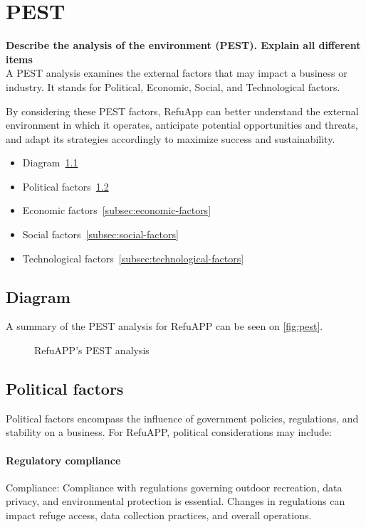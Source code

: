 \section{PEST}\label{sec:pest}

\textbf{Describe the analysis of the environment (PEST). Explain all different items}\\

A PEST analysis examines the external factors that may impact a business or industry.
It stands for Political, Economic, Social, and Technological factors.

By considering these PEST factors, RefuApp can better understand the external environment in which it operates, anticipate potential opportunities and threats, and adapt its strategies accordingly to maximize success and sustainability.

\begin{itemize}
    \item Diagram~\ref{subsec:diagram}
    \item Political factors~\ref{subsec:political-factors}
    \item Economic factors~\ref{subsec:economic-factors}
    \item Social factors~\ref{subsec:social-factors}
    \item Technological factors~\ref{subsec:technological-factors}
\end{itemize}

\subsection{Diagram}\label{subsec:diagram}
A summary of the PEST analysis for RefuAPP can be seen on \autoref{fig:pest}.
\begin{figure}[H]
    \centering
    \noindent
    \caption{RefuAPP's PEST analysis}
    \label{fig:pest}
\end{figure}

\subsection{Political factors}\label{subsec:political-factors}
Political factors encompass the influence of government policies, regulations, and stability on a business.
For RefuAPP, political considerations may include:

\paragraph{Regulatory compliance}
Compliance: Compliance with regulations governing outdoor recreation, data privacy, and environmental protection is essential.
Changes in regulations can impact refuge access, data collection practices, and overall operations.

